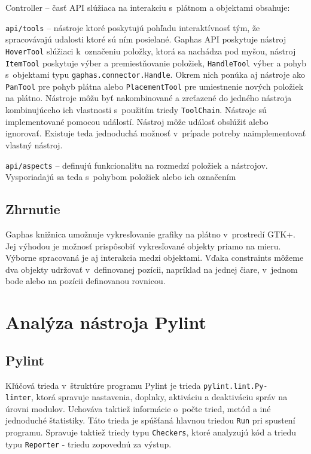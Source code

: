 \documentclass[11pt,oneside,final]{fithesis2}
\begin{document}
\begin{list}{•}{}
\item Controller -- časť API slúžiaca na interakciu s~plátnom a objektami obsahuje:
    \begin{list}{•}{}
		\item \texttt{api/tools} -- nástroje ktoré poskytujú pohľadu interaktívnosť tým, že spracovávajú udalosti ktoré sú ním posielané. Gaphas API poskytuje nástroj \texttt{HoverTool} slúžiaci k~označeniu položky, ktorá sa nachádza pod myšou, nástroj \texttt{ItemTool} poskytuje výber a premiestňovanie položiek, \texttt{HandleTool} výber a pohyb s~objektami typu \texttt{gaphas.connector.Handle}. Okrem nich ponúka aj nástroje ako \texttt{PanTool} pre pohyb plátna alebo \texttt{PlacementTool} pre umiestnenie nových položiek na plátno. Nástroje môžu byť nakombinované a zreťazené do jedného nástroja kombinujúceho ich vlastnosti s~použitím triedy \texttt{ToolChain}. Nástroje sú implementované pomocou událostí. Nástroj môže událosť obslúžiť alebo ignorovať. Existuje teda jednoduchá možnosť v~prípade potreby naimplementovať vlastný nástroj.
		\item \texttt{api/aspects} -- definujú funkcionalitu na rozmedzí položiek a nástrojov. Vysporiadajú sa teda s~pohybom položiek alebo ich označením
    \end{list}


\end{list}



	\subsection{Zhrnutie}

		Gaphas knižnica umožnuje vykresľovanie grafiky na plátno v~prostredí GTK+. Jej výhodou je možnosť prispôsobiť vykresľované objekty priamo na mieru. Výborne spracovaná je aj interakcia medzi objektami. Vďaka constraints môžeme dva objekty udržovať v~definovanej pozícii, napríklad na jednej čiare, v~jednom bode alebo na pozícii definovanou rovnicou.
    
    
\section{Analýza nástroja Pylint}

	\subsection{Pylint}
		Kľúčová trieda v~štruktúre programu Pylint je trieda \texttt{pylint.lint.Py-\\linter}, ktorá spravuje nastavenia, doplnky, aktiváciu a deaktiváciu správ na úrovni modulov. Uchováva taktiež informácie o~počte tried, metód a iné jednoduché štatistiky. Táto trieda je spúšťaná hlavnou triedou \texttt{Run} pri spustení programu. Spravuje taktiež triedy typu \texttt{Checkers}, ktoré analyzujú kód a triedu typu \texttt{Reporter} - triedu zopovednú za výstup. 
		
\end{document}
